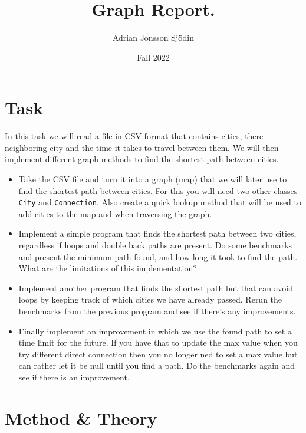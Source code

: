 \documentclass[a4paper,11pt]{article}
\begin{document}
\title{
    \textbf{Graph Report.}
}
\author{Adrian Jonsson Sjödin}
\date{Fall 2022}

\maketitle

\section{Task}
\label{task}
In this task we will read a file in CSV format that contains cities, there neighboring city and the time it takes to travel
between them. We will then implement different graph methods to find the shortest path between cities.
\begin{itemize}
    \item Take the CSV file and turn it into a graph (map) that we will later use to find the shortest path between cities. For this you will
          need two other classes {\tt City} and {\tt Connection}. Also create a quick lookup method that will be used to add cities
          to the map and when traversing the graph.

    \item Implement a simple program that finds the shortest path between two cities, regardless if loops and double back paths
          are present. Do some benchmarks and present the minimum path found, and how long it took to find the path. What are the
          limitations of this implementation?

    \item Implement another program that finds the shortest path but that can avoid loops by keeping track of which cities we have
          already passed. Rerun the benchmarks from the previous program and see if there's any improvements.

    \item Finally implement an improvement in which we use the found path to set a time limit for the future. If you have that to update
          the max value when you try different direct connection then you no longer ned to set a max value but can rather let it be null until
          you find a path. Do the benchmarks again and see if there is an improvement.

\end{itemize}

\section{Method \& Theory}
\label{method}
\end{document}
